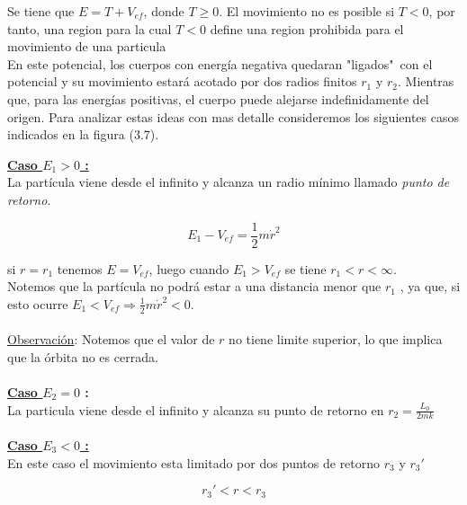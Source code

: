 \documentclass[12pt]{report}
\begin{document}
Se tiene que $E= T + V_{ef}$, donde $T \geq 0$. El movimiento no es posible si $T<0$, por tanto, una region para la cual $T<0$ define una region prohibida para el movimiento de una particula \\

 
En este potencial, los cuerpos con energía negativa quedaran "ligados"\ con el potencial y su movimiento estará acotado por dos radios finitos $r_1$ y $r_2$. Mientras que, para las energías positivas, el cuerpo puede alejarse indefinidamente del origen. Para analizar estas ideas con mas detalle consideremos los siguientes casos indicados en la figura (3.7). 




\textbf{\underline{Caso $E_1>0$ :}} \\

La partícula viene desde el infinito y alcanza un radio mínimo llamado \textit{punto de retorno}.

\begin{equation}
E_1 - V_{ef}= \frac{1}{2} m \dot{r}^2  
\end{equation}


si $r=r_1$  tenemos $E=V_{ef}$, luego cuando $E_1 > V_{ef}$ se tiene $r_1<r<\infty$. \\

Notemos que la partícula no podrá estar a una distancia menor que $r_1$ , ya que, si esto ocurre $E_1<V_{ef} \Rightarrow \displaystyle \frac{1}{2}m\dot{r}^2<0$.  \\
\\
\underline{Observación}: Notemos que el valor de $r$ no tiene limite superior, lo que implica que la órbita no es cerrada. \\
\\

\textbf{\underline{Caso $E_2=0$} :} \\

La particula viene desde el infinito y alcanza su punto de retorno  en $r_2=\displaystyle\frac{L_0}{2mk}$ \\
\\


\textbf{\underline{Caso $E_3 < 0$ :}} \\

En este caso el movimiento esta limitado por dos puntos de retorno $r_3$ y $r_3 '$

\begin{equation}
r_3' < r < r_3 
\end{equation}  
\end{document}
